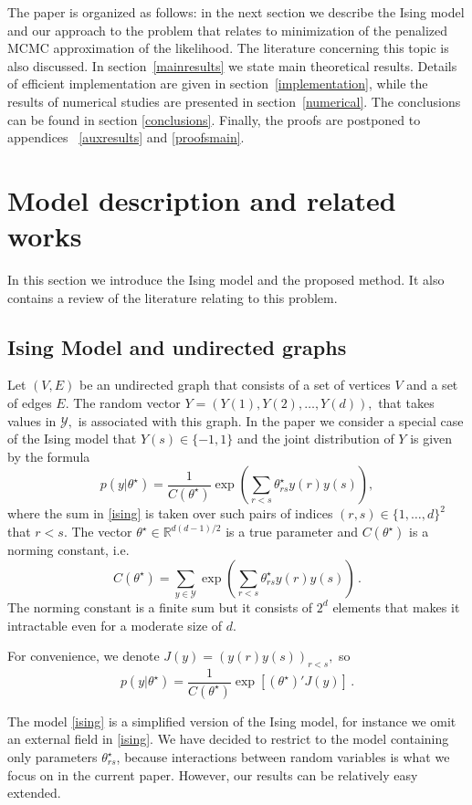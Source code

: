\documentclass[twoside,11pt]{article}
\def\th{\theta}
\def\ths{\th^\star}
\def\Y{\mathcal{Y}}
\begin{document}
The paper is organized as follows: in the next section we describe the Ising model and our approach to the problem that relates to minimization of the penalized MCMC approximation of the likelihood. The literature concerning this topic is also discussed. In section~\ref{mainresults} we state main theoretical results. Details of efficient implementation are given 
in section~\ref{implementation}, while the results of numerical studies are presented in section~\ref{numerical}. The conclusions can be found in section \ref{conclusions}. Finally,  the proofs are postponed to appendices ~\ref{auxresults} and \ref{proofsmain}.


\section{Model description and related works}
\label{model_descr}

In this section we introduce the Ising model and the proposed method. It also contains 
a review of the literature relating to this problem.

\subsection{Ising Model and undirected graphs}
\label{Ising_model}

Let $(V,E)$ be an undirected graph that consists of a set of vertices $V$ and a set of edges $E.$
The random vector $Y=(Y(1),Y(2),\ldots,Y(d)),$ that takes values in $\Y,$
is associated with this graph. In the paper we consider a special case of the Ising model that 
$Y(s) \in \{-1,1\}$ and the joint distribution of $Y$ is given by the formula 
\begin{equation}
\label{ising}
p(y| \ths) = \frac{1}{C(\ths)} \exp \left( \sum_{r<s} \ths_{rs} y(r) y(s) \right),
\end{equation}
where the sum in \eqref{ising} is taken over such pairs of indices  $(r,s) \in \{1,\ldots, d\}^2 $ that $r<s.$ The vector $\ths \in \mathbb{R}^{d(d-1)/2}$ is a true parameter and $C(\ths)$ is a norming constant, i.e. 
\[C(\ths)= \sum_{y\in \Y} \exp \left( \sum_{r<s} \ths_{rs} y(r) y(s) \right)\,.\]  
The norming constant is a finite sum but it consists of $2^d$ elements that makes it intractable even for a moderate size of $d$.

For convenience, we denote $J(y)=\left(
y(r)y(s) \right)_{r<s},$ so 
\[p(y|\ths)=  \frac{1}{C(\ths)} \exp \left[(\ths)' J(y) \right]\,.\] 

\begin{remark}
The model \eqref{ising} is a simplified version of the Ising model, for instance we omit an external field in \eqref{ising}. We have decided to restrict to the model 
containing only parameters $\ths _{rs}$, because interactions between random variables is what we focus on  in the current paper. However, our results can be relatively easy extended.
\end{remark}
\end{document}
